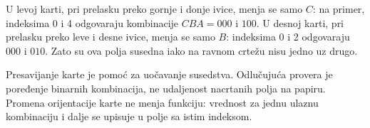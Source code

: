 
U levoj karti, pri prelasku preko gornje i donje ivice, menja se samo \(C\): na primer, indeksima 0 i 4 odgovaraju kombinacije \(CBA=000\) i \(100\). U desnoj karti, pri prelasku preko leve i desne ivice, menja se samo \(B\): indeksima 0 i 2 odgovaraju \(000\) i \(010\). Zato su ova polja susedna iako na ravnom crtežu nisu jedno uz drugo.

Presavijanje karte je pomoć za uočavanje susedstva. Odlučujuća provera je poređenje binarnih kombinacija, ne udaljenost nacrtanih polja na papiru. Promena orijentacije karte ne menja funkciju: vrednost za jednu ulaznu kombinaciju i dalje se upisuje u polje sa istim indeksom.
